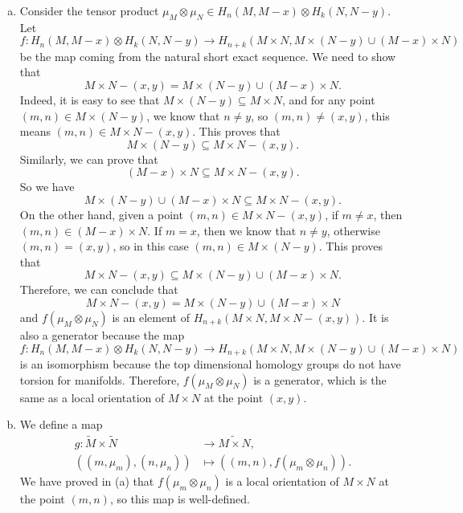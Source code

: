 \documentclass[letterpaper, 12pt]{article}
\begin{document}
\begin{solution}
\begin{enumerate}[(a)]
\item Consider the tensor product \(\mu_M\otimes \mu_N\in H_n(M,M-x)\otimes H_k(N,N-y)\). Let 
\[f:H_n(M,M-x)\otimes H_k(N,N-y)\rightarrow H_{n+k}(M\times N, M\times (N-y)\cup (M-x)\times N)\]
 be the map coming from the natural short exact sequence. We need to show that 
 \[M\times N-(x,y) =M\times (N-y)\cup (M-x)\times N.\]
Indeed, it is easy to see that \(M\times (N-y)\subseteq M\times N\), and for any point \((m,n)\in M\times (N-y)\), we know that \(n\neq y\), so \((m,n)\neq (x,y)\), this means \((m,n)\in M\times N-(x,y)\). This proves that 
\[M\times (N-y)\subseteq M\times N-(x,y).\]
Similarly, we can prove that 
\[(M-x)\times N\subseteq M\times N-(x,y).\]
So we have 
\[M\times (N-y)\cup (M-x)\times N\subseteq M\times N-(x,y).\]
On the other hand, given a point \((m,n)\in M\times N-(x,y)\), if \(m\neq x\), then \((m,n)\in (M-x)\times N\). If \(m=x\), then we know that \(n\neq y\), otherwise \((m,n)=(x,y)\), so in this case \((m,n)\in M\times (N-y)\). This proves that 
\[M\times N-(x,y)\subseteq M\times (N-y)\cup (M-x)\times N.\]
Therefore, we can conclude that 
\[M\times N-(x,y)=M\times (N-y)\cup (M-x)\times N\]
and \(f(\mu_M\otimes \mu_N)\) is an element of \(H_{n+k}(M\times N,M\times N-(x,y))\). It is also a generator because the map 
\[f:H_n(M,M-x)\otimes H_k(N,N-y)\rightarrow H_{n+k}(M\times N, M\times (N-y)\cup (M-x)\times N)\]
is an isomorphism because the top dimensional homology groups do not have torsion for manifolds. Therefore, \(f(\mu_M\otimes \mu_N)\) is a generator, which is the same as a local orientation of \(M\times N\) at the point \((x,y)\).
\item We define a map 
\begin{align*}
    g:\tilde{M}\times\tilde{N}&\rightarrow \widetilde{M\times N},\\ 
      ((m,\mu_m),(n,\mu_n))&\mapsto ((m,n),f(\mu_m\otimes \mu_n)). 
\end{align*}
We have proved in (a) that \(f(\mu_m\otimes \mu_n)\) is a local orientation of \(M\times N\) at the point \((m,n)\), so this map is well-defined. 


\end{enumerate}
\end{solution}
\end{document}
